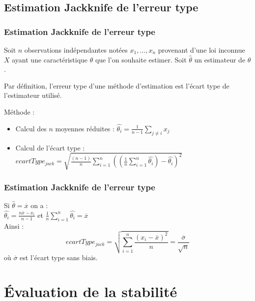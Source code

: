 \documentclass[handout]{beamer}
\begin{document}
		\subsection{Estimation Jackknife de l'erreur type}
		\begin{frame}
			\frametitle{Estimation Jackknife de l'erreur type}
			Soit $n$ observations indépendantes notées $x_1, \dots, x_n$ provenant d'une loi inconnue $X$ ayant une caractéristique $\theta$ que l'on souhaite estimer. Soit $\hat{\theta}$ un estimateur de $\theta$.

			\vspace{10px}
			Par définition, l'erreur type d'une méthode d'estimation est l'écart type de l'estimateur utilisé.

			\vspace{15px}
			Méthode :
			\begin{itemize}
				\item Calcul des $n$ moyennes réduites : $\hat{\theta_i} = \frac{1}{n - 1}\sum\limits_{j \neq i } x_j$
				\item Calcul de l'écart type : $ecartType_{jack} = \sqrt{\frac{(n - 1)}{n} \sum\limits_{i=1}^n ((\frac{1}{n} \sum\limits_{i=1}^n \hat{\theta_i}) - \hat{\theta_i})^2}$
			\end{itemize}


		\end{frame}

		\begin{frame}
			\frametitle{Estimation Jackknife de l'erreur type}
			Si $\hat{\theta} = \overline{x}$ on a :\\

			\vspace{5px}
			$\hat{\theta_i} = \frac{n\overline{x} - x_i}{n - 1}$ et $\frac{1}{n} \sum\limits_{i=1}^n \hat{\theta_i} = \overline{x}$\\

			\vspace{15px}
			Ainsi :
			\[ecartType_{jack} = \sqrt{\sum\limits_{i=1}^n \frac{(x_i - \overline{x})^2}{n}} = \frac{\overline{\sigma}}{\sqrt{n}}\]
			où $\overline{\sigma}$ est l'écart type sans biais.
		\end{frame}

	\section{Évaluation de la stabilité}
\end{document}
